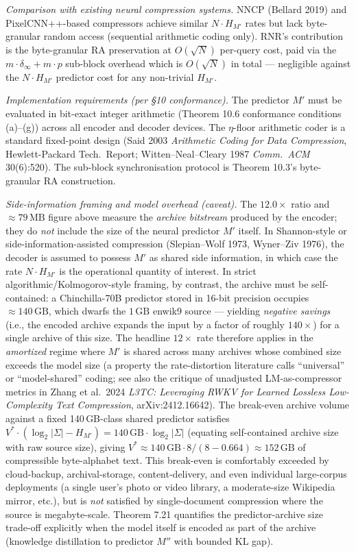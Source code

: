 \documentclass[
]{article}
\begin{document}
\emph{Comparison with existing neural compression systems.}
NNCP (Bellard 2019) and PixelCNN++-based compressors achieve similar
$N \cdot H_{M'}$ rates but lack byte-granular random access (sequential
arithmetic coding only). RNR's contribution is the byte-granular RA
preservation at $O(\sqrt{N})$ per-query cost, paid via the
$m \cdot \delta_\infty + m \cdot p$ sub-block overhead which is
$O(\sqrt{N})$ in total — negligible against the $N \cdot H_{M'}$
predictor cost for any non-trivial $H_{M'}$.

\emph{Implementation requirements (per §10 conformance).} The
predictor $M'$ must be evaluated in bit-exact integer arithmetic
(Theorem 10.6 conformance conditions (a)--(g)) across all encoder
and decoder devices. The $\eta$-floor arithmetic coder is a standard
fixed-point design (Said 2003 \emph{Arithmetic Coding for Data
Compression}, Hewlett-Packard Tech.\ Report; Witten--Neal--Cleary
1987 \emph{Comm.\ ACM} 30(6):520). The sub-block synchronisation
protocol is Theorem 10.3's byte-granular RA construction.

\emph{Side-information framing and model overhead (caveat).}
The $12.0\times$ ratio and $\approx 79\,\mathrm{MB}$ figure above
measure the \emph{archive bitstream} produced by the encoder; they
do \emph{not} include the size of the neural predictor $M'$ itself.
In Shannon-style or side-information-assisted compression
(Slepian--Wolf 1973, Wyner--Ziv 1976), the decoder is assumed to
possess $M'$ as shared side information, in which case the rate
$N \cdot H_{M'}$ is the operational quantity of interest. In strict
algorithmic/Kolmogorov-style framing, by contrast, the archive must
be self-contained: a Chinchilla-70B predictor stored in 16-bit
precision occupies $\approx 140\,\mathrm{GB}$, which dwarfs the
$1\,\mathrm{GB}$ enwik9 source --- yielding \emph{negative savings}
(i.e., the encoded archive expands the input by a factor of roughly
$140\times$) for a single archive of this size. The headline
$12\times$ rate therefore applies in the \emph{amortized} regime where
$M'$ is shared across many archives whose combined size exceeds the
model size (a property the rate-distortion literature calls
``universal'' or ``model-shared'' coding; see also the critique of
unadjusted LM-as-compressor metrics in Zhang et al.\ 2024
\emph{L3TC: Leveraging RWKV for Learned Lossless Low-Complexity Text
Compression}, arXiv:2412.16642). The break-even archive volume against
a fixed 140\,GB-class shared predictor satisfies
$V^* \cdot (\log_2|\Sigma| - H_{M'}) = 140\,\mathrm{GB} \cdot \log_2|\Sigma|$
(equating self-contained archive size with raw source size), giving
$V^* \approx 140\,\mathrm{GB} \cdot 8 / (8 - 0.664) \approx 152\,\mathrm{GB}$
of compressible byte-alphabet text. This break-even is comfortably
exceeded by cloud-backup, archival-storage, content-delivery, and
even individual large-corpus deployments (a single user's photo or
video library, a moderate-size Wikipedia mirror, etc.), but is
\emph{not} satisfied by single-document compression where the source
is megabyte-scale. Theorem
7.21 quantifies the predictor-archive size trade-off explicitly when the
model itself is encoded as part of the archive (knowledge distillation
to predictor $M''$ with bounded KL gap).
\end{document}
